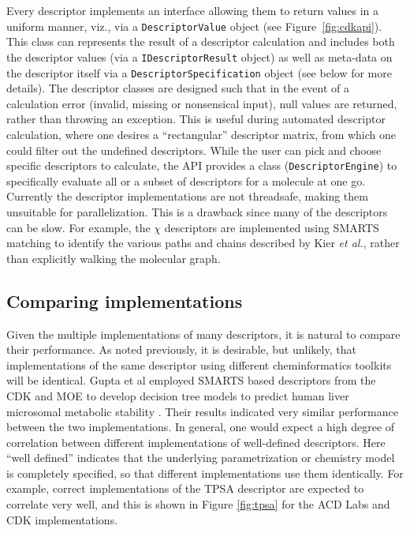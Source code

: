 \documentclass[letterpaper, 12pt]{article}
\begin{document}
Every descriptor implements an interface allowing them to
return values in a uniform manner, viz., via a \texttt{DescriptorValue}
object (see Figure~\ref{fig:cdkapi}). This class can represents the result
of a descriptor calculation and includes both the descriptor values
(via a \texttt{IDescriptorResult} object) as well as meta-data on the
descriptor itself via a \texttt{DescriptorSpecification} object (see
below for more details). The descriptor classes are designed such that
in the event of a calculation error (invalid, missing or nonsensical
input), null values are returned, rather than throwing an
exception. This is useful during automated descriptor calculation,
where one desires a ``rectangular'' descriptor matrix, from which one
could filter out the undefined descriptors. While the user can pick
and choose specific descriptors to calculate, the API provides a class
(\texttt{DescriptorEngine}) to specifically evaluate all or a subset
of descriptors for a molecule at one go.  Currently the descriptor
implementations are not threadsafe, making them unsuitable for
parallelization. This is a drawback since many of the descriptors can
be slow. For example, the $\chi$ descriptors \cite{Kier:1976aa} are
implemented using SMARTS matching to identify the various paths and
chains described by Kier \textit{et al.}, rather than explicitly walking the
molecular graph.

\subsection{Comparing implementations}
\label{sec:comp-impl}


Given the multiple implementations of many descriptors, it is natural
to compare their performance. As noted previously, it is desirable,
but unlikely, that implementations of the same descriptor using
different cheminformatics toolkits will be identical. Gupta et al
employed SMARTS based descriptors from the CDK and MOE to develop
decision tree models to predict human liver microsomal metabolic
stability \cite{Gupta:2010uq}. Their results indicated very similar
performance between the two implementations. In general, one would
expect a high degree of correlation between different implementations
of well-defined descriptors. Here ``well defined'' indicates that the
underlying parametrization or chemistry model is completely specified,
so that different implementations use them identically. For example,
correct implementations of the TPSA descriptor are expected to
correlate very well, and this is shown in Figure \ref{fig:tpsa} for
the ACD Labs and CDK implementations.
\end{document}
